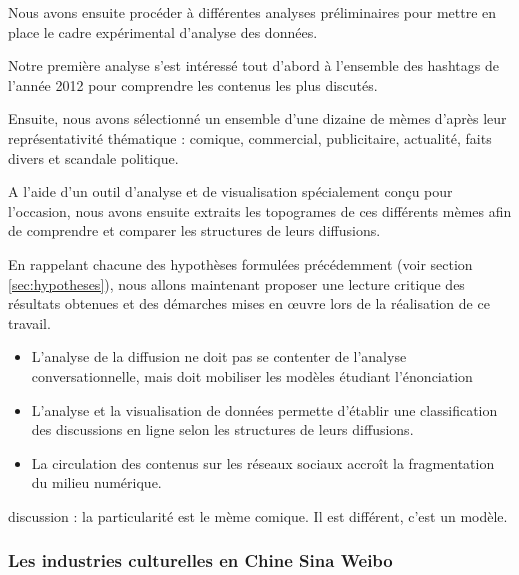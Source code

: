 Nous avons ensuite procéder à différentes analyses préliminaires pour mettre en place le cadre expérimental d'analyse des données.

Notre première analyse s{\textquoteright}est intéressé tout d{\textquoteright}abord à l{\textquoteright}ensemble des hashtags de l{\textquoteright}année 2012 pour comprendre les contenus les plus discutés. 

Ensuite, nous avons sélectionné un ensemble d{\textquoteright}une dizaine de mèmes d{\textquoteright}après leur représentativité thématique : comique, commercial, publicitaire, actualité, faits divers et scandale politique. 

A l{\textquoteright}aide d{\textquoteright}un outil d{\textquoteright}analyse et de visualisation spécialement con\c{c}u pour l{\textquoteright}occasion, nous avons ensuite extraits les topogrames de ces différents mèmes afin de comprendre et comparer les structures de leurs diffusions.



En rappelant chacune des hypothèses formulées précédemment (voir section \ref{sec:hypotheses}), nous allons maintenant proposer une lecture critique des résultats obtenues et des démarches mises en œuvre lors de la réalisation de ce travail. 


\begin{itemize}


\item{L'analyse de la diffusion ne doit pas se contenter de l'analyse conversationnelle, mais doit mobiliser les modèles étudiant l'énonciation} 

\item{L'analyse et la visualisation de données permette d'établir une classification des discussions en ligne selon les structures de leurs diffusions.}

\item{La circulation des contenus sur les réseaux sociaux accroît la fragmentation du milieu numérique.}
\end{itemize}


discussion : la particularité est le mème comique. Il est différent, c'est un modèle.




\subsubsection{Les industries culturelles en Chine Sina Weibo} 

